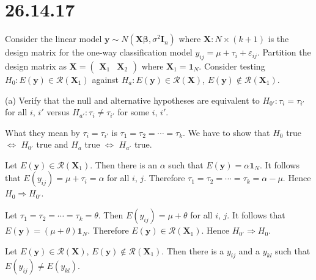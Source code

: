 \section*{26.14.17}
Consider the linear model $\mathbf y\sim N(\mathbf X\bm\beta,
\sigma^2\mathbf I_n)$ where $\mathbf X: N\times(k+1)$ is the
design matrix for the one-way classification model
$y_{ij}=\mu+\tau_i+\varepsilon_{ij}$.
Partition the design matrix as $\mathbf X=
\begin{pmatrix}\mathbf X_1 & \mathbf X_2\end{pmatrix}$
where $\mathbf X_1=\mathbf 1_N$.
Consider testing $H_0:E(\mathbf y)\in\mathcal R(\mathbf X_1)$
against $H_a:E(\mathbf y)\in\mathcal R(\mathbf X)$,
$E(\mathbf y)\not\in\mathcal R(\mathbf X_1)$.

\bigskip
\noindent
(a) Verify that the null and alternative hypotheses are equivalent
to $H_{0'}:\tau_i=\tau_{i'}$ for all $i$, $i'$ versus
$H_{a'}:\tau_i\ne\tau_{i'}$ for some $i$, $i'$.

\bigskip
\noindent
What they mean by $\tau_i=\tau_{i'}$ is
$\tau_1=\tau_2=\cdots=\tau_k$.
We have to show that $H_0$ true $\Leftrightarrow$
$H_{0'}$ true and $H_a$ true $\Leftrightarrow$ $H_{a'}$ true.

\bigskip
\noindent
Let $E(\mathbf y)\in\mathcal R(\mathbf X_1)$.
Then there is an $\alpha$ such that $E(\mathbf y)=\alpha\mathbf1_N$.
It follows that $E(y_{ij})=\mu+\tau_i=\alpha$ for all $i$, $j$.
Therefore $\tau_1=\tau_2=\cdots=\tau_k=\alpha-\mu$.
Hence $H_0\Rightarrow H_{0'}$.

\bigskip
\noindent
Let $\tau_1=\tau_2=\cdots=\tau_k=\theta$.
Then $E(y_{ij})=\mu+\theta$ for all $i$, $j$.
It follows that $E(\mathbf y)=(\mu+\theta)\mathbf 1_N$.
Therefore $E(\mathbf y)\in\mathcal R(\mathbf X_1)$.
Hence $H_{0'}\Rightarrow H_0$.

\bigskip
\noindent
Let $E(\mathbf y)\in\mathcal R(\mathbf X)$,
$E(\mathbf y)\not\in\mathcal R(\mathbf X_1)$.
Then there is a $y_{ij}$ and a $y_{kl}$ such that
$E(y_{ij})\ne E(y_{kl})$.

